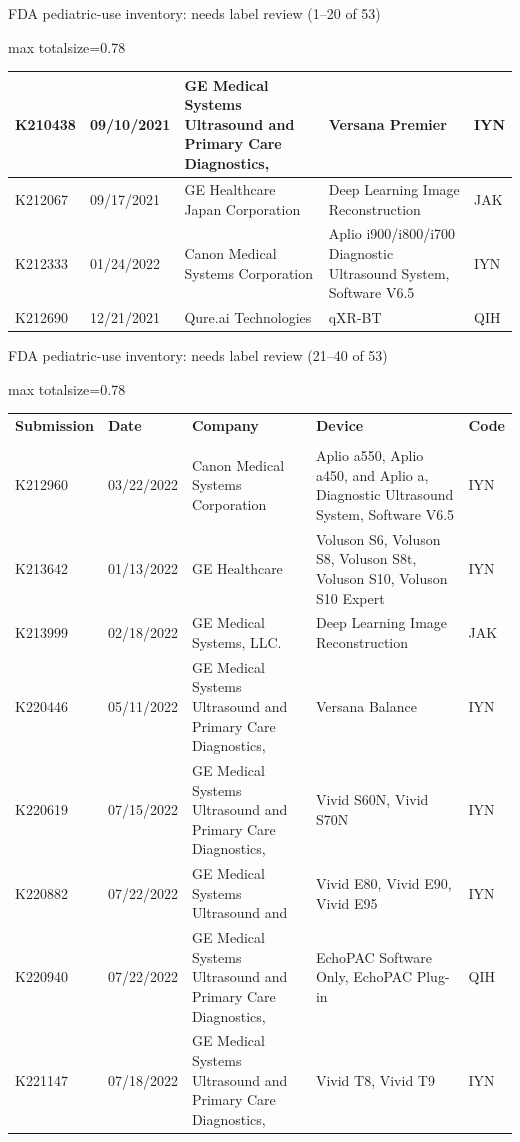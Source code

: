 \documentclass[aspectratio=169]{beamer}
\renewcommand{\arraystretch}{1.08}
\begin{document}
\begin{frame}[category=FDA appendix]{FDA pediatric-use inventory: needs label review (1--20 of 53)}
\begin{adjustbox}{max totalsize={\textwidth}{0.78\textheight}}
\begin{tabular}{|p{}|p{}|p{}|p{}|p{}|}
K210438 & 09/10/2021 & GE Medical Systems Ultrasound and Primary Care Diagnostics, & Versana Premier & IYN \\ \hline
K212067 & 09/17/2021 & GE Healthcare Japan Corporation & Deep Learning Image Reconstruction & JAK \\ \hline
K212333 & 01/24/2022 & Canon Medical Systems Corporation & Aplio i900/i800/i700 Diagnostic Ultrasound System, Software V6.5 & IYN \\ \hline
K212690 & 12/21/2021 & Qure.ai Technologies & qXR-BT & QIH \\ \hline
\end{tabular}
\end{adjustbox}
\end{frame}
\begin{frame}[category=FDA appendix]{FDA pediatric-use inventory: needs label review (21--40 of 53)}
\begin{adjustbox}{max totalsize={\textwidth}{0.78\textheight}}
\renewcommand{\arraystretch}{1.2}
\begin{tabular}{|p{}|p{}|p{}|p{}|p{}|}
\hline \textbf{Submission} & \textbf{Date} & \textbf{Company} & \textbf{Device} & \textbf{Code} \\\\ \hline
K212960 & 03/22/2022 & Canon Medical Systems Corporation & Aplio a550, Aplio a450, and Aplio a, Diagnostic Ultrasound System, Software V6.5 & IYN \\ \hline
K213642 & 01/13/2022 & GE Healthcare & Voluson S6, Voluson S8, Voluson S8t, Voluson S10, Voluson S10 Expert & IYN \\ \hline
K213999 & 02/18/2022 & GE Medical Systems, LLC. & Deep Learning Image Reconstruction & JAK \\ \hline
K220446 & 05/11/2022 & GE Medical Systems Ultrasound and Primary Care Diagnostics, & Versana Balance & IYN \\ \hline
K220619 & 07/15/2022 & GE Medical Systems Ultrasound and Primary Care Diagnostics, & Vivid S60N, Vivid S70N & IYN \\ \hline
K220882 & 07/22/2022 & GE Medical Systems Ultrasound and & Vivid E80, Vivid E90, Vivid E95 & IYN \\ \hline
K220940 & 07/22/2022 & GE Medical Systems Ultrasound and Primary Care Diagnostics, & EchoPAC Software Only, EchoPAC Plug-in & QIH \\ \hline
K221147 & 07/18/2022 & GE Medical Systems Ultrasound and Primary Care Diagnostics, & Vivid T8, Vivid T9 & IYN \\ \hline

\end{tabular}
\end{adjustbox}
\end{frame}
\end{document}
